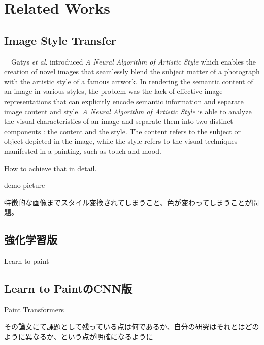 \chapter{Related Works}

\section{Image Style Transfer}
　Gatys \textit{et al}. \cite{Gatys_2016_CVPR} introduced \textit{A Neural Algorithm of Artistic 
Style} which enables the creation of novel images that seamlessly blend the subject 
matter of a photograph with the artistic style of a famous artwork.
In rendering the semantic content of an image in various styles, the problem was
the lack of effective image representations that can explicitly encode semantic information 
and separate image content and style. 
\textit{A Neural Algorithm of Artistic Style} \cite{Gatys_2016_CVPR} is able to analyze the 
visual characteristics of an image and separate them into two distinct components
: the content and the style.
The content refers to the subject or object depicted in the image, while the style 
refers to the visual techniques manifested in a painting, such as touch and mood.

How to achieve that in detail. 

demo picture

特徴的な画像までスタイル変換されてしまうこと、色が変わってしまうことが問題。

\section{強化学習版}
Learn to paint \cite{Huang_2019_ICCV}
\section{Learn to PaintのCNN版}
Paint Transformers \cite{liu2021paint}

その論文にて課題として残っている点は何であるか、自分の研究はそれとはどのように異なるか、という点が明確になるように
